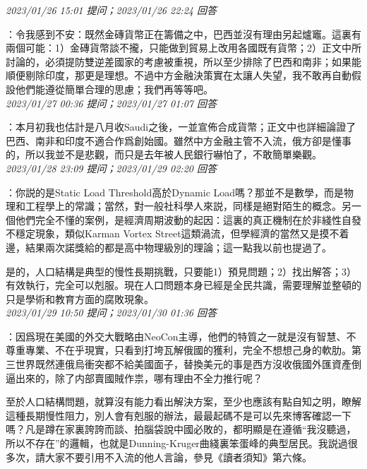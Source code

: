 \documentclass[twocolumn]{ctexart}
\begin{document}
\textit{\hfill\noindent\small 2023/01/26 15:01 提问；2023/01/26 22:24 回答}

：令我感到不安：既然金磚貨幣正在籌備之中，巴西並沒有理由另起爐竈。這裏有兩個可能：1）金磚貨幣談不攏，只能做到貿易上改用各國既有貨幣；2）正文中所討論的，必須提防雙逆差國家的考慮被重視，所以至少排除了巴西和南非；如果能順便剔除印度，那更是理想。不過中方金融決策實在太讓人失望，我不敢再自動假設他們能遵從簡單合理的思慮；我們再等等吧。
\\

\textit{\hfill\noindent\small 2023/01/27 00:36 提问；2023/01/27 01:07 回答}

：本月初我也估計是八月收Saudi之後，一並宣佈合成貨幣；正文中也詳細論證了巴西、南非和印度不適合作爲創始國。雖然中方金融主管不入流，俄方卻是懂事的，所以我並不是悲觀，而只是去年被人民銀行嚇怕了，不敢簡單樂觀。
\\

\textit{\hfill\noindent\small 2023/01/28 23:09 提问；2023/01/29 02:20 回答}

：你説的是Static Load Threshold高於Dynamic Load嗎？那並不是數學，而是物理和工程學上的常識；當然，對一般社科學人來説，同樣是絕對陌生的概念。另一個他們完全不懂的案例，是經濟周期波動的起因：這裏的真正機制在於非綫性自發不穩定現象，類似Karman Vortex Street這類渦流，但學經濟的當然又是摸不着邊，結果兩次諾獎給的都是高中物理級別的理論；這一點我以前也提過了。

是的，人口結構是典型的慢性長期挑戰，只要能1）預見問題；2）找出解答；3）有效執行，完全可以剋服。現在人口問題本身已經是全民共識，需要理解並整頓的只是學術和教育方面的腐敗現象。
\\

\textit{\hfill\noindent\small 2023/01/29 10:50 提问；2023/01/30 01:36 回答}

：因爲現在美國的外交大戰略由NeoCon主導，他們的特質之一就是沒有智慧、不尊重專業、不在乎現實，只看到打垮瓦解俄國的獲利，完全不想想己身的軟肋。第三世界既然連俄烏衝突都不給美國面子，替換美元的事是西方沒收俄國外匯資產倒逼出來的，除了内部賣國賊作祟，哪有理由不全力推行呢？

至於人口結構問題，就算沒有能力看出解決方案，至少也應該有點自知之明，瞭解這種長期慢性阻力，別人會有剋服的辦法，最最起碼不是可以先來博客確認一下嗎？凡是蹲在家裏誇誇而談、拍腦袋說中國必敗的，都明顯是在遵循“我沒聽過，所以不存在”的邏輯，也就是Dunning-Kruger曲綫裏笨蛋峰的典型居民。我説過很多次，請大家不要引用不入流的他人言論，參見《讀者須知》第六條。
\\
\end{document}
